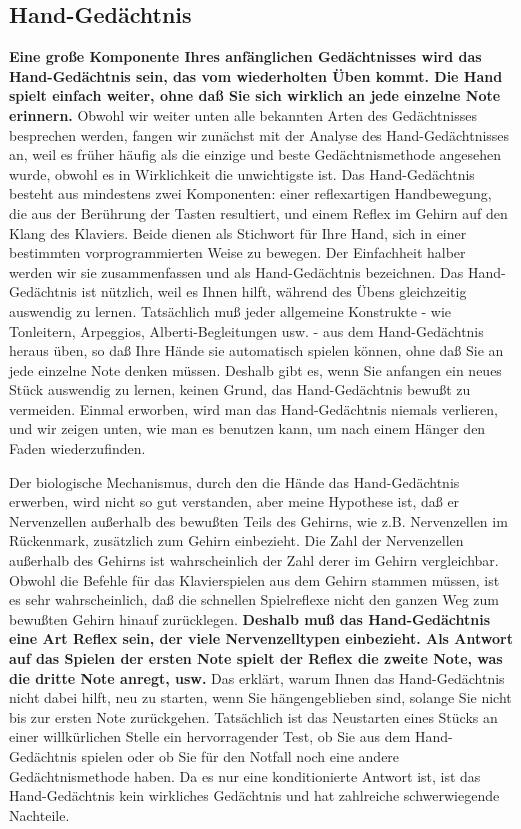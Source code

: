 \subsection{Hand-Gedächtnis}
\label{c1iii6d}

\textbf{Eine große Komponente Ihres anfänglichen Gedächtnisses wird das Hand-Gedächtnis sein, das vom wiederholten Üben kommt.
Die Hand spielt einfach weiter, ohne daß Sie sich wirklich an jede einzelne Note  erinnern.}
Obwohl wir weiter unten alle bekannten Arten des Gedächtnisses besprechen werden, fangen wir zunächst mit der Analyse des Hand-Gedächtnisses an, weil es früher häufig als die einzige und beste Gedächtnismethode angesehen wurde, obwohl es in Wirklichkeit die unwichtigste ist.
Das Hand-Gedächtnis besteht aus mindestens zwei Komponenten: einer reflexartigen Handbewegung, die aus der Berührung der Tasten resultiert, und einem Reflex im Gehirn auf den Klang des Klaviers.
Beide dienen als Stichwort für Ihre Hand, sich in einer bestimmten vorprogrammierten Weise zu bewegen.
Der Einfachheit halber werden wir sie zusammenfassen und als Hand-Gedächtnis bezeichnen.
Das Hand-Gedächtnis ist nützlich, weil es Ihnen hilft, während des Übens gleichzeitig auswendig zu lernen.
Tatsächlich muß jeder allgemeine Konstrukte - wie Tonleitern, Arpeggios, Alberti-Begleitungen usw. - aus dem Hand-Gedächtnis heraus üben, so daß Ihre Hände sie automatisch spielen können, ohne daß Sie an jede einzelne Note denken müssen.
Deshalb gibt es, wenn Sie anfangen ein neues Stück auswendig zu lernen, keinen Grund, das Hand-Gedächtnis bewußt zu vermeiden.
Einmal erworben, wird man das Hand-Gedächtnis niemals verlieren, und wir zeigen unten, wie man es benutzen kann, um nach einem Hänger den Faden wiederzufinden.

Der biologische Mechanismus, durch den die Hände das Hand-Gedächtnis erwerben, wird nicht so gut verstanden, aber meine Hypothese ist, daß er Nervenzellen außerhalb des bewußten Teils des Gehirns, wie z.B. Nervenzellen im Rückenmark, zusätzlich zum Gehirn einbezieht.
Die Zahl der Nervenzellen außerhalb des Gehirns ist wahrscheinlich der Zahl derer im Gehirn vergleichbar.
Obwohl die Befehle für das Klavierspielen aus dem Gehirn stammen müssen, ist es sehr wahrscheinlich, daß die schnellen Spielreflexe nicht den ganzen Weg zum bewußten Gehirn hinauf zurücklegen.
\textbf{Deshalb muß das Hand-Gedächtnis eine Art Reflex sein, der viele Nervenzelltypen einbezieht.
Als Antwort auf das Spielen der ersten Note spielt der Reflex die zweite Note, was die dritte Note anregt, usw.}
Das erklärt, warum Ihnen das Hand-Gedächtnis nicht dabei hilft, neu zu starten, wenn Sie hängengeblieben sind, solange Sie nicht bis zur ersten Note zurückgehen.
Tatsächlich ist das Neustarten eines Stücks an einer willkürlichen Stelle ein hervorragender Test, ob Sie aus dem Hand-Gedächtnis spielen oder ob Sie für den Notfall noch eine andere Gedächtnismethode haben.
Da es nur eine konditionierte Antwort ist, ist das Hand-Gedächtnis kein wirkliches Gedächtnis und hat zahlreiche schwerwiegende Nachteile.

